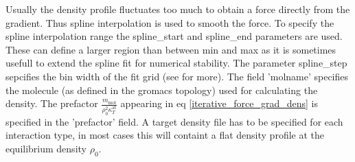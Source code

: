 Usually the density profile fluctuates too much to obtain a force directly from the gradient. Thus spline interpolation is used to smooth the force. To specify the spline interpolation range the spline\_start and spline\_end parameters are used. These can define a larger region than between min and max as it is sometimes usefull to extend the spline fit for numerical stability. The parameter spline\_step sepcifies the bin width of the fit grid (see  for more). 
The field 'molname' specifies the molecule (as defined in the gromacs topology) used for calculating the density. 
The prefactor $\frac{m_\text{mol}}{\rho_0^2 \kappa_T^\text{at}}$ appearing in eq \ref{iterative_force_grad_dens} is specified in the 'prefactor' field.
A target density file has to be specified for each interaction type, in most cases this will containt a flat density profile at the equilibrium density $\rho_0$. \\
